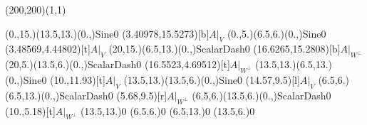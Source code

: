 \unitlength=1bp%

\begin{feynartspicture}(200,200)(1,1)

\FADiagram{}
\FAProp(0.,15.)(13.5,13.)(0.,){Sine}{0}
\FALabel(3.40978,15.5273)[b]{$A|_V$}
\FAProp(0.,5.)(6.5,6.)(0.,){Sine}{0}
\FALabel(3.48569,4.44802)[t]{$A|_V$}
\FAProp(20,15.)(6.5,13.)(0.,){ScalarDash}{0}
\FALabel(16.6265,15.2808)[b]{$A|_{W^\perp}$}
\FAProp(20,5.)(13.5,6.)(0.,){ScalarDash}{0}
\FALabel(16.5523,4.69512)[t]{$A|_{W^\perp}$}
\FAProp(13.5,13.)(6.5,13.)(0.,){Sine}{0}
\FALabel(10.,11.93)[t]{$A|_V$}
\FAProp(13.5,13.)(13.5,6.)(0.,){Sine}{0}
\FALabel(14.57,9.5)[l]{$A|_V$}
\FAProp(6.5,6.)(6.5,13.)(0.,){ScalarDash}{0}
\FALabel(5.68,9.5)[r]{$A|_{W^\perp}$}
\FAProp(6.5,6.)(13.5,6.)(0.,){ScalarDash}{0}
\FALabel(10.,5.18)[t]{$A|_{W^\perp}$}
\FAVert(13.5,13.){0}
\FAVert(6.5,6.){0}
\FAVert(6.5,13.){0}
\FAVert(13.5,6.){0}
\end{feynartspicture}

